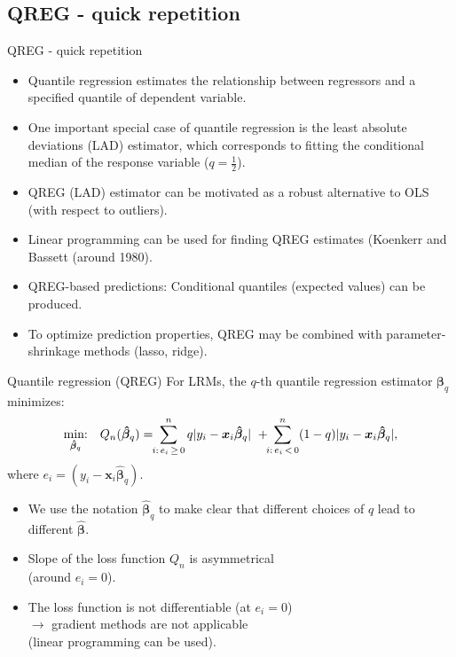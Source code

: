 \documentclass{beamer}
\begin{document}
\subsection{QREG - quick repetition}
\begin{frame}{QREG - quick repetition}
\begin{itemize}
\item Quantile regression estimates the relationship between regressors and a specified quantile of dependent variable.
\medskip
\item One important special case of quantile regression is the least absolute deviations (LAD) estimator, which corresponds to fitting the conditional median of the response variable ($q=\frac{1}{2}$).
\medskip
\item QREG (LAD) estimator can be motivated as a robust  alternative to OLS (with respect to outliers).
\medskip
\item Linear programming can be used for finding QREG estimates (Koenkerr and Bassett (around 1980).
\medskip
\item QREG-based predictions: Conditional quantiles (expected values) can be produced.
\medskip
\item To optimize prediction properties, QREG may be combined with parameter-shrinkage methods (lasso, ridge).
\end{itemize}
\end{frame}
\begin{frame}{Quantile regression (QREG)}
For LRMs, the $q$-th quantile regression estimator $\bm{\beta}_q$ minimizes:
$$
\underset{\bm{\hat{\beta}}_q}{\textnormal{min:}} \quad Q_n(\bm{\hat{\beta}}_q) =
\! \! \sum^n_{i:\, e_i \, \geq \, 0} q|y_i - \bm{x}_i\bm{\hat{\beta}}_q| \,\, +
\! \! \sum^n_{i:\, e_i\, < \, 0} (1-q)|y_i - \bm{x}_i\bm{\hat{\beta}}_q|,
$$
where $e_i = (y_i - \bm{x}_i\bm{\hat{\beta}}_q)$.

\begin{itemize}
    \item We use the notation $\bm{\hat{\beta}}_q$ to make clear that different choices of $q$ lead to different  $\bm{\hat{\beta}}$.
    \item Slope of the loss function $Q_n$ is asymmetrical \\(around $e_i=0$).
    \item The loss function is not differentiable (at $e_i=0$) \\$\rightarrow$ gradient methods are not applicable \\(linear programming can be used).
\end{itemize}
\end{frame}
\end{document}
